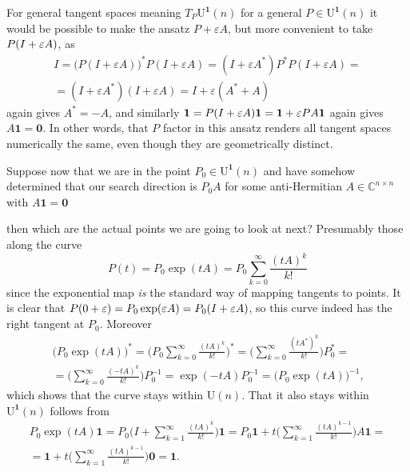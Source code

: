\documentclass{article}
\newcommand{\C}{\mathbb{C}}
\newcommand{\ve}{\varepsilon}
\newcommand{\vek}{\mathbf}
\newcommand{\UOne}{\mathrm{U}^{\vek{1}}}
\theoremstyle{definition}
\providecommand*{\Dash}{%
   \nobreak\hspace{0.166667em}\textemdash\hspace{0.166667em}%
}
\providecommand*{\Ldash}{%
   \hspace{0.166667em}\textemdash\nobreak\hspace{0.166667em}%
}
\providecommand*{\Rdash}{\Dash}
\begin{document}
For general tangent spaces\Ldash meaning $T_P\UOne(n)$ for a general 
\(P \in \UOne(n)\)\Rdash it would be possible to make the ansatz $P + 
\ve A$, but more convenient to take $P(I +\nobreak \ve A)$, as
\begin{multline*}
  I = 
  \bigl( P (I + \ve A) \bigr)^* P (I+ \ve A) =
  (I + \ve A^*) P^* P (I+ \ve A) = \\ =
  (I + \ve A^*) (I+ \ve A) =
  I + \ve(A^*+A)
\end{multline*}
again gives \(A^* = -A\), and similarly \(\vek{1} = 
P(I +\nobreak \ve A)\vek{1} = \vek{1} + \ve P A \vek{1}\) again gives 
\(A \vek{1} = \vek{0}\). In other words, that $P$ factor in this 
ansatz renders all tangent spaces numerically the same, even though 
they are geometrically distinct.

Suppose now that we are in the point \(P_0 \in \UOne(n)\) and have 
somehow determined that our search direction is $P_0 A$ for some 
anti-Hermitian \(A \in \C^{n \times n}\) with \(A\vek{1} = \vek{0}\)\Dash 
then which are the actual points we are going to look at next? Presumably 
those along the curve
\begin{equation}
  P(t) = P_0 \exp(tA) = P_0 \sum_{k=0}^\infty \frac{(tA)^k}{k!}
\end{equation}
since the exponential map \emph{is} the standard way of mapping 
tangents to points. It is clear that \(P(0 + \nobreak \ve) = 
P_0 \exp(\ve A) = P_0 (I +\nobreak \ve A)\), so this curve indeed has 
the right tangent at $P_0$. Moreover
\begin{multline*}
  \bigl( P_0 \exp(tA) \bigr)^* =
  \biggl( P_0 \sum_{k=0}^\infty \frac{(tA)^k}{k!} \biggr)^* =
  \biggl( \sum_{k=0}^\infty \frac{(t A^*)^k}{k!} \biggr) P_0^* = \\ =
  \biggl( \sum_{k=0}^\infty \frac{(-t A)^k}{k!} \biggr) P_0^{-1} =
  \exp(-tA) P_0^{-1} =
  \bigl( P_0 \exp(tA) \bigr)^{-1} \text{,}
\end{multline*}
which shows that the curve stays within $\mathrm{U}(n)$. That it also 
stays within $\UOne(n)$ follows from
\begin{multline*}
  P_0 \exp(tA) \vek{1} =
  P_0 \biggl( I + \sum_{k=1}^\infty \frac{(tA)^k}{k!} \biggr) \vek{1} 
  =
  P_0 \vek{1} + 
    t \biggl( \sum_{k=1}^\infty \frac{(tA)^{k-1}}{k!} \biggr) A \vek{1} 
    = \\ =
  \vek{1} +
    t \biggl( \sum_{k=1}^\infty \frac{(tA)^{k-1}}{k!} \biggr) \vek{0} 
    =
  \vek{1} \text{.}
\end{multline*}
\end{document}
